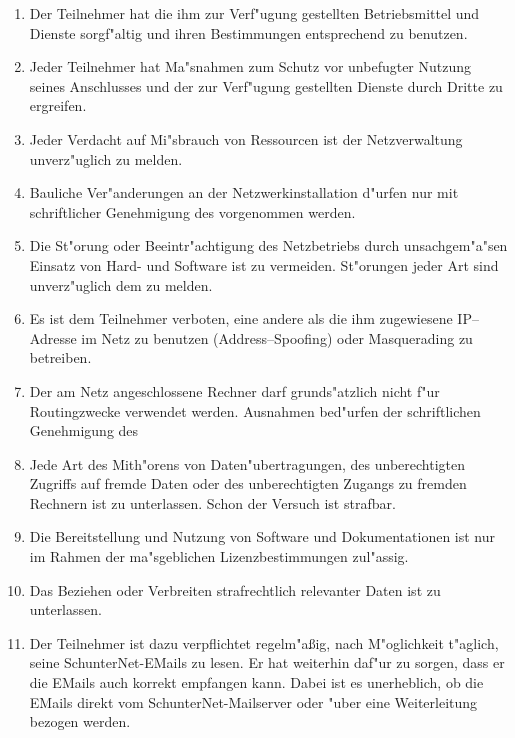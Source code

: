 \begin{enumerate}
  \item Der Teilnehmer hat die ihm zur Verf"ugung gestellten Betriebsmittel
      und Dienste sorgf"altig und ihren Bestimmungen entsprechend zu benutzen.
  \item Jeder Teilnehmer hat Ma"snahmen zum Schutz vor
      unbefugter Nutzung seines Anschlusses und der zur Verf"ugung gestellten
      Dienste durch Dritte zu ergreifen.
  \item Jeder Verdacht auf Mi"sbrauch von Ressourcen ist der Netzverwaltung
      unverz"uglich zu melden.
  \item Bauliche Ver"anderungen an der Netzwerkinstallation d"urfen nur mit
      schriftlicher Genehmigung des \snev vorgenommen werden.
  \item Die St"orung oder Beeintr"achtigung des Netzbetriebs durch unsachgem"a"sen
      Einsatz von Hard- und Software ist zu vermeiden. St"orungen jeder Art
      sind unverz"uglich dem \snev zu melden.
  \item Es ist dem Teilnehmer verboten,  eine andere als die ihm zugewiesene
      IP--Adresse im Netz zu benutzen (Address--Spoofing) oder Masquerading zu
      betreiben.
  \item Der am Netz angeschlossene Rechner darf grunds"atzlich nicht f"ur
      Routingzwecke verwendet werden. Ausnahmen bed"urfen der schriftlichen
      Genehmigung des \snev
  \item Jede Art des Mith"orens von Daten"ubertragungen, des unberechtigten
      Zugriffs auf fremde Daten oder des unberechtigten Zugangs zu fremden
      Rechnern ist zu unterlassen. Schon der Versuch ist strafbar.
  \item Die Bereitstellung und Nutzung von Software und Dokumentationen ist
      nur im Rahmen der ma"sgeblichen Lizenzbestimmungen zul"assig.
  \item Das Beziehen oder Verbreiten strafrechtlich relevanter Daten ist zu
      unterlassen.
  \item Der Teilnehmer ist dazu verpflichtet regelm"a\ss ig, nach M"oglichkeit
      t"aglich,  seine SchunterNet-EMails zu lesen. Er hat weiterhin daf"ur zu
      sorgen,  dass  er die EMails auch korrekt empfangen kann. Dabei ist es
      unerheblich, ob die EMails direkt vom SchunterNet-Mailserver oder "uber
      eine Weiterleitung bezogen werden.
\end{enumerate}


